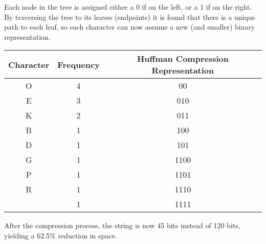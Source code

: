 \documentclass{article}
\begin{document}
\noindent Each node in the tree is assigned either a 0 if on the left, or a 1 if on the right. By traversing the tree to its leaves (endpoints) it is found that there is a unique path to each leaf, so each character can now assume a new (and smaller) binary representation.
	\begin{center}
		\begin{tabular}{| c | c | c |}
			\hline
			Character & Frequency & Huffman Compression Representation\\
			\hline
			O & 4 & 00\\
			E & 3 & 010\\
			K & 2 & 011\\
			B & 1 & 100\\
			D & 1 & 101\\
			G & 1 & 1100\\
			P & 1 & 1101\\
			R & 1 & 1110\\
			  & 1 & 1111\\
			\hline
		\end{tabular}
	\end{center}
\noindent After the compression process, the string is now 45 bits instead of 120 bits, yielding a 62.5\% reduction in space.
\end{document}
